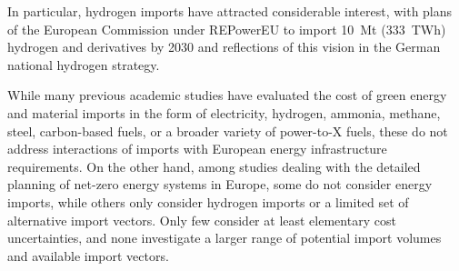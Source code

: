 

In particular, hydrogen imports have attracted considerable interest, with plans
of the European Commission under
\mbox{REPowerEU}\cite{europeancommissionRepowerEUPlan} to import 10~Mt (333~TWh)
hydrogen and derivatives by 2030 and reflections of this vision in the German
national hydrogen
strategy.\cite{bundesministeriumfuerwirtschaftundklimaschutzFortschreibungNationalen2023}



While many previous academic studies have evaluated the cost of green energy and material imports in the form of
electricity,\cite{lilliestamEnergySecurity2011,triebSolarElectricity2012,lilliestamVulnerabilityTerrorist2014,bogdanovNorthEastAsian2016,benaslaTransitionSustainable2019,reichenbergDeepDecarbonization2022}%
hydrogen,\cite{timmerbergHydrogenRenewables2019,ishimotoLargescaleProduction2020,brandleEstimatingLongterm2021,luxSupplyCurves2021,galvanExportingSunshine2022,collisDeterminingProduction2022,galimovaImpactInternational2023}
ammonia,\cite{nayak-lukeTechnoeconomicViability2020,armijoFlexibleProduction2020,galimovaFeasibilityGreen2023}
methane,\cite{luxSupplyCurves2021,agoraenergiewendeHydrogenImport2022}
steel,\cite{trollipHowGreen2022a,devlinRegionalSupply2022,lopezDefossilisedSteel2023}
carbon-based
fuels,\cite{fasihiLongTermHydrocarbon2017,sherwinElectrofuelSynthesis2021} or a
broader variety of power-to-X
fuels,\cite{vanderzwaanTimmermansDream2021,pfennigGlobalGISbased2022,irenaGlobalHydrogen2022,solerEFuelsTechno2022,hamppImportOptions2023,gengeSupplyCosts2023,galimovaGlobalTrading2023a}
these do not address interactions of imports with European energy infrastructure
requirements. On the other hand, among studies dealing with the detailed
planning of net-zero energy systems in Europe, some do not consider energy
imports,\cite{pickeringDiversityOptions2022,brownSynergiesSector2018,victoriaSpeedTechnological2022}
while others only consider hydrogen imports or a limited set of alternative
import
vectors.\cite{gilsInteractionHydrogen2021,seckHydrogenDecarbonization2022,wetzelGreenEnergy2023,kountourisUnifiedEuropean2023,neumannPotentialRole2023}
Only few consider at least elementary cost
uncertainties,\cite{frischmuthHydrogenSourcing2022} and none investigate a
larger range of potential import volumes and available import vectors.


